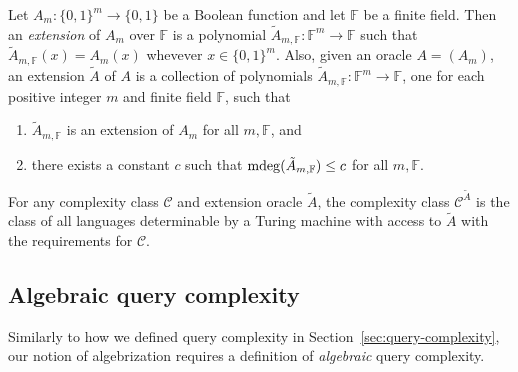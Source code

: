 \begin{defn}[{\cite[Def.\ 2.2]{AW09}}]\label{def:ext-oracle}
  Let $A_{m}: \{0, 1\}^{m} \rightarrow \{0, 1\}$ be a Boolean function and let
  $\mathbb{F}$ be a finite field. Then an \emph{extension} of $A_{m}$
  over $\mathbb{F}$ is a polynomial
  $\tilde{A}_{m,\mathbb{F}}: \mathbb{F}^{m} \rightarrow \mathbb{F}$ such that
  $\tilde{A}_{m,\mathbb{F}}(x) = A_{m}(x)$ whevever $x \in \{0, 1\}^{m}$. Also,
  given an oracle $A = (A_{m})$, an extension $\tilde{A}$ of $A$ is a
  collection of polynomials
  $\tilde{A}_{m,\mathbb{F}}: \mathbb{F}^{m} \rightarrow \mathbb{F}$, one for each positive
  integer $m$ and finite field $\mathbb{F}$, such that
  \begin{enumerate}
    \item $\tilde{A}_{m,\mathbb{F}}$ is an extension of $A_{m}$ for all
          $m,\mathbb{F}$, and
    \item there exists a constant $c$ such that
          $\operatorname{mdeg}(\tilde{A}_{m,\mathbb{F}}) \le c$ for all $m, \mathbb{F}$.
  \end{enumerate}
\end{defn}

\begin{defn}[{\cite[Def.\ 2.2]{AW09}}]\label{def:ext-oracle-class}
  For any complexity class $\mathcal{C}$ and extension oracle $\tilde{A}$, the complexity
  class $\mathcal{C}^{\tilde{A}}$ is the class of all languages determinable by a Turing
  machine with access to $\tilde{A}$ with the requirements for $\mathcal{C}$.
\end{defn}


\subsection{Algebraic query complexity}

Similarly to how we defined query complexity in
Section~\ref{sec:query-complexity}, our notion of algebrization requires a
definition of \emph{algebraic} query complexity. %

